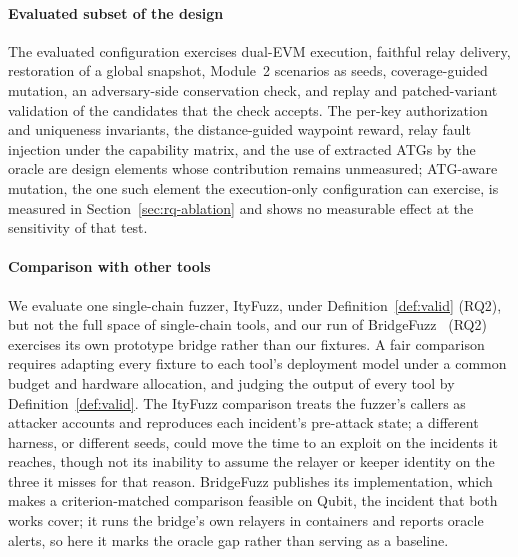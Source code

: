 \documentclass[a4paper]{cas-sc}
\begin{document}
\paragraph{Evaluated subset of the design}
The evaluated configuration exercises dual-EVM execution, faithful relay delivery, restoration of a global snapshot, Module~2 scenarios as seeds, coverage-guided mutation, an adversary-side conservation check, and replay and patched-variant validation of the candidates that the check accepts. The per-key authorization and uniqueness invariants, the distance-guided waypoint reward, relay fault injection under the capability matrix, and the use of extracted ATGs by the oracle are design elements whose contribution remains unmeasured; ATG-aware mutation, the one such element the execution-only configuration can exercise, is measured in Section~\ref{sec:rq-ablation} and shows no measurable effect at the sensitivity of that test.

\paragraph{Comparison with other tools}
We evaluate one single-chain fuzzer, ItyFuzz, under Definition~\ref{def:valid} (RQ2), but not the full space of single-chain tools, and our run of BridgeFuzz~\citep{winkler2026bridgefuzz} (RQ2) exercises its own prototype bridge rather than our fixtures. A fair comparison requires adapting every fixture to each tool's deployment model under a common budget and hardware allocation, and judging the output of every tool by Definition~\ref{def:valid}. The ItyFuzz comparison treats the fuzzer's callers as attacker accounts and reproduces each incident's pre-attack state; a different harness, or different seeds, could move the time to an exploit on the incidents it reaches, though not its inability to assume the relayer or keeper identity on the three it misses for that reason. BridgeFuzz publishes its implementation, which makes a criterion-matched comparison feasible on Qubit, the incident that both works cover; it runs the bridge's own relayers in containers and reports oracle alerts, so here it marks the oracle gap rather than serving as a baseline.
\end{document}

